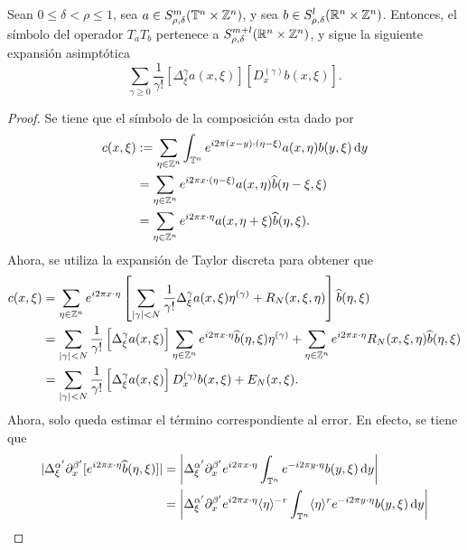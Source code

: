 \begin{theorem}
	Sean $0\leq\delta<\rho\leq1$, sea $a\in S^m_{\rho, \delta}(\mathbb{T}^n\times\mathbb{Z}^n)$, y sea $b\in S^l_{\rho, \delta}(\mathbb{R}^n\times\mathbb{Z}^n)$. Entonces, el símbolo del operador $T_aT_b$ pertenece a $S^{m+l}_{\rho, \delta}(\mathbb{R}^n\times\mathbb{Z}^n)$, y sigue la siguiente expansión asimptótica
	\begin{equation*}
		\sum_{\gamma\geq0} \frac{1}{\gamma!}[\Delta^\gamma_\xi a(x, \xi)][D^{(\gamma)}_xb(x, \xi)].
	\end{equation*}
\end{theorem}
\begin{proof}
	Se tiene que el símbolo de la composición esta dado por
	\begin{align*}
		c(x, \xi) & :=  \sum_{\eta\in\mathbb{Z}^n}\int_{\mathbb{T}^n} 
		e^{i2\pi (x-y)\cdot(\eta-\xi)} a(x, \eta)b(y, \xi)\mathop{}\!\mathrm{d} y \\ 
		& = \sum_{\eta\in\mathbb{Z}^n} e^{i2\pi x\cdot(\eta-\xi)}  a(x, \eta) \widehat{b}(\eta-\xi, \xi)\\ 
		& = \sum_{\eta\in\mathbb{Z}^n} e^{i2\pi x\cdot\eta}  a(x, \eta+\xi) \widehat{b}(\eta, \xi).
	\end{align*}
	Ahora, se utiliza la expansión de Taylor discreta para obtener que
	\begin{align*}
		c(x, \xi) &=  \sum_{\eta\in\mathbb{Z}^n} e^{i2\pi x\cdot\eta} \left[\sum_{|\gamma|<N}\frac{1}{\gamma!}\Delta^\gamma_\xi a(x, \xi)\eta^{(\gamma)} + R_N(x, \xi, \eta)
		\right] \widehat{b}(\eta, \xi)\\
		& = \sum_{|\gamma|<N}\frac{1}{\gamma!}\left[ \Delta^\gamma_\xi a(x, \xi) \right] \sum_{\eta\in\mathbb{Z}^n} e^{i2\pi x\cdot\eta}\widehat{b}(\eta, \xi)\eta^{(\gamma)}  + \sum_{\eta\in\mathbb{Z}^n} e^{i2\pi x\cdot\eta}R_N(x, \xi, \eta)  \widehat{b}(\eta, \xi) \\
		& = \sum_{|\gamma|<N}\frac{1}{\gamma!}\left[ \Delta^\gamma_\xi a(x, \xi) \right] D^{(\gamma)}_x b(x, \xi) + E_N(x, \xi).
	\end{align*}
	Ahora, solo queda estimar el término correspondiente al error. En efecto, se tiene que
	\begin{align*}
		|\Delta^{\alpha'}_\xi\partial^{\beta'}_x [e^{i2\pi x\cdot\eta}\widehat{b}(\eta, \xi)]| & =  \left|\Delta^{\alpha'}_\xi\partial^{\beta'}_x  e^{i2\pi x\cdot\eta} \int_{\T^n} e^{-i2\pi y\cdot\eta} b(y, \xi) \diff y
		\right| \\
		& =  \left|\Delta^{\alpha'}_\xi\partial^{\beta'}_x  e^{i2\pi x\cdot\eta}\angles{\eta}^{-r} \int_{\T^n}\angles{\eta}^r e^{-i2\pi y\cdot\eta} b(y, \xi) \diff y
		\right|\\

\end{align*}
\end{proof}

